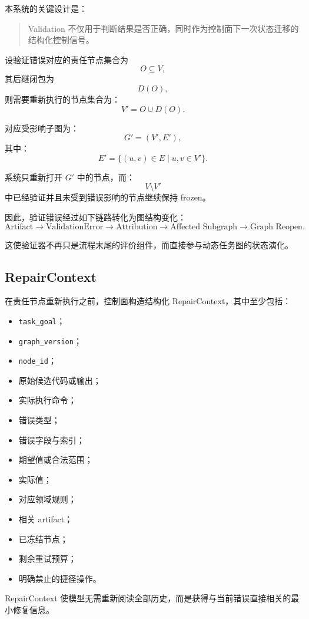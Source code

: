 \documentclass[UTF8,a4paper,12pt,oneside]{ctexbook}
\begin{document}
本系统的关键设计是：

\begin{quote}
Validation 不仅用于判断结果是否正确，同时作为控制面下一次状态迁移的结构化控制信号。
\end{quote}

设验证错误对应的责任节点集合为
\[
O\subseteq V,
\]
其后继闭包为
\[
D(O),
\]
则需要重新执行的节点集合为：
\[
V'=O\cup D(O).
\]

对应受影响子图为：
\[
G'=(V',E'),
\]
其中：
\[
E'=
\{(u,v)\in E\mid u,v\in V'\}.
\]

系统只重新打开 $G'$ 中的节点，而：
\[
V\setminus V'
\]
中已经验证并且未受到错误影响的节点继续保持 frozen。

因此，验证错误经过如下链路转化为图结构变化：
\[
\text{Artifact}
\rightarrow
\text{ValidationError}
\rightarrow
\text{Attribution}
\rightarrow
\text{Affected Subgraph}
\rightarrow
\text{Graph Reopen}.
\]

这使验证器不再只是流程末尾的评价组件，而直接参与动态任务图的状态演化。


\subsection{RepairContext}

在责任节点重新执行之前，控制面构造结构化 RepairContext，其中至少包括：

\begin{itemize}
    \item \texttt{task\_goal}；
    \item \texttt{graph\_version}；
    \item \texttt{node\_id}；
    \item 原始候选代码或输出；
    \item 实际执行命令；
    \item 错误类型；
    \item 错误字段与索引；
    \item 期望值或合法范围；
    \item 实际值；
    \item 对应领域规则；
    \item 相关 artifact；
    \item 已冻结节点；
    \item 剩余重试预算；
    \item 明确禁止的捷径操作。
\end{itemize}

RepairContext 使模型无需重新阅读全部历史，而是获得与当前错误直接相关的最小修复信息。
\end{document}
